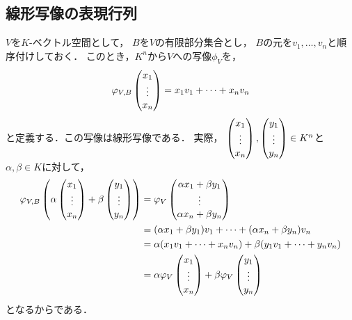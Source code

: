 \subsection{線形写像の表現行列}
$V$を$K$-ベクトル空間として，
$B$を$V$の有限部分集合とし，
$B$の元を$v_1,\dots,v_n$と順序付けしておく．
このとき，$K^n$から$V$への写像$\phi_V$を，
\begin{equation}\label{eq:coord_map}
    \varphi_{V,B}\begin{pmatrix} x_1 \\ \vdots \\ x_n \end{pmatrix} = x_1 v_1 + \dots + x_n v_n
\end{equation}
と定義する．この写像は線形写像である．
実際，
$\begin{pmatrix} x_1 \\ \vdots \\ x_n \end{pmatrix},\begin{pmatrix} y_1 \\ \vdots \\ y_n \end{pmatrix} \in K^n$と$\alpha,\beta \in K$に対して，
\[
    \begin{aligned}
        \varphi_{V,B} \left( \alpha \pmt{x_1 \\ \vdots \\ x_n} + \beta \pmt{y_1 \\ \vdots \\ y_n} \right) %
        &= \varphi_V \pmt{\alpha x_1 + \beta y_1 \\ \vdots \\ \alpha x_n + \beta y_n} \\
        &= (\alpha x_1 + \beta y_1) v_1 + \dots + (\alpha x_n + \beta y_n) v_n \\
        &= \alpha (x_1 v_1 + \dots + x_n v_n) + \beta(y_1 v_1 + \dots + y_n v_n) \\
        &= \alpha \varphi_V\pmt{x_1 \\ \vdots \\ x_n} + \beta \varphi_V\pmt{y_1 \\ \vdots \\ y_n} 
    \end{aligned}
\]
となるからである．

